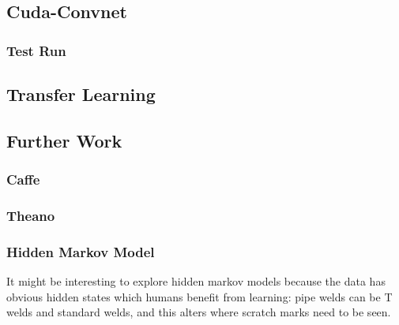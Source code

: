 \documentclass[a4paper,11pt]{article}
\begin{document}
\subsection{Cuda-Convnet}
\subsubsection{Test Run}
\subsection{Transfer Learning}

\subsection{Further Work}

\subsubsection{Caffe}

\subsubsection{Theano}

\subsubsection{Hidden Markov Model}

It might be interesting to explore hidden markov models because the data has obvious hidden states which humans benefit from learning: pipe welds can be T welds and standard welds, and this alters where scratch marks need to be seen.

\clearpage
\end{document}
